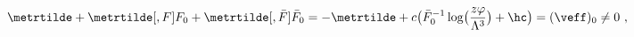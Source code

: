 \begin{equation}
  \label{eq:L1cond}
\metrtilde  + \metrtilde[, F] F_0 +
    \metrtilde[, \bar{F}] \bar{F}_0 = - \metrtilde + c \bigl(\bar{F}_0^{-1}
    \log\bigl( \frac{z\varphi}{\Lambda^3}\bigr) + \hc \bigr)  = (\veff)_0 \neq 0\ ,
\end{equation}

